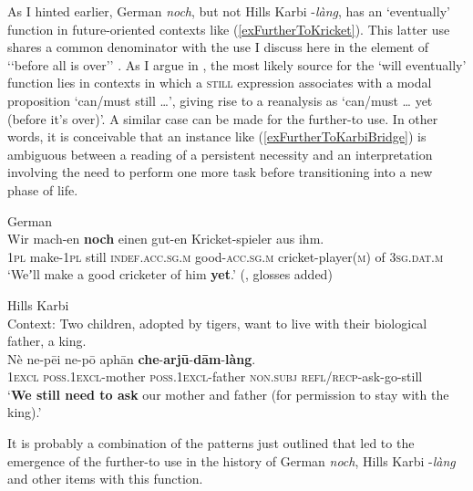 {As I hinted earlier, German \textit{noch}, but not Hills Karbi \mbox{-\textit{làng}}, has an \lq eventually\rq{ }function in future-oriented contexts like (\ref{exFurtherToKricket}). This latter use shares a common denominator with the use I discuss here in the element of \lq\lq{}before all is over\rq\rq{ }\parencite[s.v. \textit{yet}]{OED2022}. As I argue in , the most likely source for the \lq will eventually\rq{ }function lies in contexts in which a \textsc{still} expression associates with a modal proposition \lq can/must still …\rq{}, giving rise to a reanalysis as \lq can/must … yet (before it's over)\rq{}. A similar case can be made for the further-to use. In other words, it is conceivable that an instance like (\ref{exFurtherToKarbiBridge}) is ambiguous between a reading of a persistent necessity and an interpretation involving the need to perform one more task before transitioning into a new phase of life.

\begin{exe}
	\ex German\label{exFurtherToKricket}\\
	\gll Wir mach-en \textbf{noch} einen gut-en Kricket-spieler aus ihm.\\
	1\textsc{pl} make-1\textsc{pl} still \textsc{indef}.\textsc{acc}.\textsc{sg}.\textsc{m} good-\textsc{acc}.\textsc{sg}.\textsc{m} cricket-player(\textsc{m}) of 3\textsc{sg}.\textsc{dat}.\textsc{m}\\
	\glt \lq Weʼll make a good cricketer of him \textbf{yet}.\rq{ }(\cite[197]{Koenig1977}, glosses added)

	\ex Hills Karbi\label{exFurtherToKarbiBridge}\\
	Context: Two children, adopted by tigers, want to live with their biological father, a king.\\
	\gll Nè ne-pēi ne-pō aphān \textbf{che}-\textbf{arjū}-\textbf{dām}-\textbf{làng}.\\
	1\textsc{excl} \textsc{poss}.1\textsc{excl}-mother \textsc{poss}.1\textsc{excl}-father \textsc{non}.\textsc{subj} \textsc{refl}/\textsc{recp}-ask-go-still\\
	\glt \lq \textbf{We still need to ask} our mother and father (for permission to stay with the king).’ \parencite[154]{KonnerthTisso2018}
\end{exe}

It is probably a combination of the patterns just outlined that led to the emergence of the further-to use in the history of German \textit{noch}, Hills Karbi \mbox{-\textit{làng}} and other items with this function.

}
